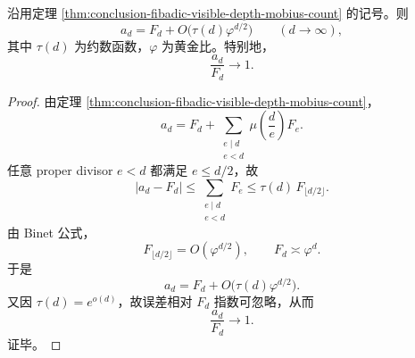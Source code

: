 \begin{corollary}[精确深度角色的指数占优定律]\label{cor:conclusion-fibadic-exact-depth-characters-dominate}
沿用定理 \ref{thm:conclusion-fibadic-visible-depth-mobius-count} 的记号。则
\[
a_d=F_d+O\!\bigl(\tau(d)\varphi^{d/2}\bigr)
\qquad(d\to\infty),
\]
其中 \(\tau(d)\) 为约数函数，\(\varphi\) 为黄金比。特别地，
\[
\frac{a_d}{F_d}\longrightarrow 1.
\]
\end{corollary}
\begin{proof}
由定理 \ref{thm:conclusion-fibadic-visible-depth-mobius-count}，
\[
a_d
=
F_d+\sum_{\substack{e\mid d\\ e<d}}\mu\!\left(\frac{d}{e}\right)F_e.
\]
任意 proper divisor \(e<d\) 都满足 \(e\le d/2\)，故
\[
|a_d-F_d|
\le
\sum_{\substack{e\mid d\\ e<d}}F_e
\le
\tau(d)\,F_{\lfloor d/2\rfloor}.
\]
由 Binet 公式，
\[
F_{\lfloor d/2\rfloor}=O(\varphi^{d/2}),
\qquad
F_d\asymp \varphi^d.
\]
于是
\[
a_d=F_d+O\!\bigl(\tau(d)\varphi^{d/2}\bigr).
\]
又因 \(\tau(d)=e^{o(d)}\)，故误差相对 \(F_d\) 指数可忽略，从而
\[
\frac{a_d}{F_d}\to 1.
\]
证毕。
\end{proof}

